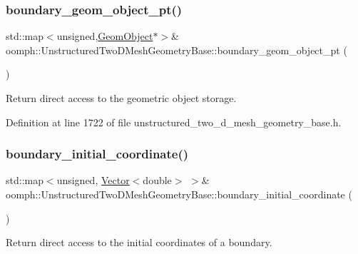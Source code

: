 \subsubsection{\texorpdfstring{boundary\+\_\+geom\+\_\+object\+\_\+pt()}{boundary\_geom\_object\_pt()}\hspace{0.1cm}{\footnotesize\ttfamily [2/2]}}
{\footnotesize\ttfamily std\+::map$<$unsigned,\hyperlink{classoomph_1_1GeomObject}{Geom\+Object}$\ast$$>$\& oomph\+::\+Unstructured\+Two\+D\+Mesh\+Geometry\+Base\+::boundary\+\_\+geom\+\_\+object\+\_\+pt (\begin{DoxyParamCaption}{ }\end{DoxyParamCaption})\hspace{0.3cm}{\ttfamily [inline]}}



Return direct access to the geometric object storage. 



Definition at line 1722 of file unstructured\+\_\+two\+\_\+d\+\_\+mesh\+\_\+geometry\+\_\+base.\+h.

\mbox{\label{classoomph_1_1UnstructuredTwoDMeshGeometryBase_aecab296a3a2dc4b413458309748b6065}} 
\subsubsection{\texorpdfstring{boundary\+\_\+initial\+\_\+coordinate()}{boundary\_initial\_coordinate()}\hspace{0.1cm}{\footnotesize\ttfamily [1/2]}}
{\footnotesize\ttfamily std\+::map$<$unsigned, \hyperlink{classoomph_1_1Vector}{Vector}$<$double$>$ $>$\& oomph\+::\+Unstructured\+Two\+D\+Mesh\+Geometry\+Base\+::boundary\+\_\+initial\+\_\+coordinate (\begin{DoxyParamCaption}{ }\end{DoxyParamCaption})\hspace{0.3cm}{\ttfamily [inline]}}



Return direct access to the initial coordinates of a boundary. 



